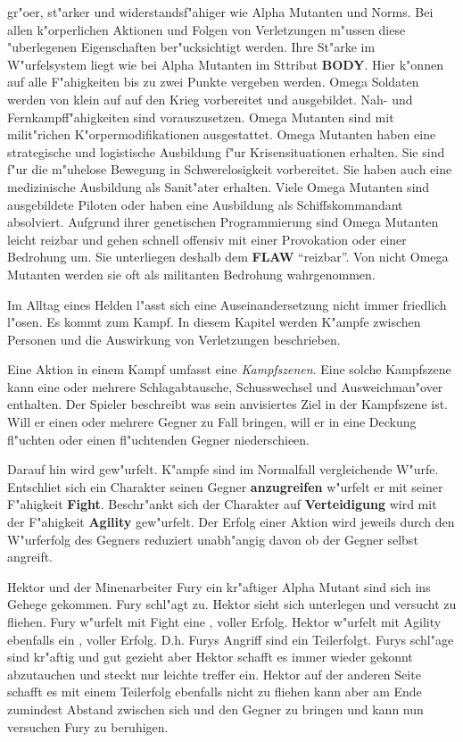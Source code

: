 \begin{description}
        gr"o\3er, st"arker und widerstandsf"ahiger wie Alpha Mutanten und Norms. Bei allen k"orperlichen Aktionen und Folgen von Verletzungen m"ussen diese "uberlegenen Eigenschaften ber"ucksichtigt werden. Ihre St"arke im W"urfelsystem liegt wie bei Alpha Mutanten im Sttribut \textbf{BODY}. Hier k"onnen auf alle F"ahigkeiten bis zu zwei Punkte vergeben werden. Omega Soldaten werden von klein auf auf den Krieg vorbereitet und ausgebildet. Nah- und Fernkampff"ahigkeiten sind vorauszusetzen. Omega Mutanten sind mit milit"richen K"orpermodifikationen ausgestattet. Omega Mutanten haben eine strategische und logistische Ausbildung f"ur Krisensituationen erhalten. Sie sind f"ur die m"uhelose Bewegung in Schwerelosigkeit vorbereitet. Sie haben auch eine medizinische Ausbildung als Sanit"ater erhalten. Viele Omega Mutanten sind ausgebildete Piloten oder haben eine Ausbildung als Schiffskommandant absolviert. Aufgrund ihrer genetischen Programmierung sind Omega Mutanten leicht reizbar und gehen schnell offensiv mit einer Provokation oder einer Bedrohung um. Sie unterliegen deshalb dem \textbf{FLAW} "`reizbar"'. Von nicht Omega Mutanten werden sie oft als militanten Bedrohung wahrgenommen.
\end{description}

Im Alltag eines Helden l"asst sich eine Auseinandersetzung nicht immer friedlich l"osen. Es kommt zum Kampf. In diesem Kapitel werden K"ampfe zwischen Personen und die Auswirkung von Verletzungen beschrieben.

Eine Aktion in einem Kampf umfasst eine \emph{Kampfszenen}. Eine solche Kampfszene kann eine oder mehrere Schlagabtausche, Schusswechsel und Ausweichman"over enthalten. Der Spieler beschreibt was sein anvisiertes Ziel in der Kampfszene ist. Will er einen oder mehrere Gegner zu Fall bringen, will er in eine Deckung fl"uchten oder einen fl"uchtenden Gegner niederschie\3en. 

Darauf hin wird gew"urfelt. K"ampfe sind im Normalfall vergleichende W"urfe. Entschlie\3t sich ein Charakter seinen Gegner \textbf{anzugreifen} w"urfelt er mit seiner F"ahigkeit \textbf{Fight}. Beschr"ankt sich der Charakter auf \textbf{Verteidigung} wird mit der F"ahigkeit \textbf{Agility} gew"urfelt. Der Erfolg einer Aktion wird jeweils durch den W"urferfolg des Gegners reduziert unabh"angig davon ob der Gegner selbst angreift.

\begin{ruleexample}
    Hektor und der Minenarbeiter Fury ein kr"aftiger Alpha Mutant sind sich ins Gehege gekommen. Fury schl"agt zu. Hektor sieht sich unterlegen und versucht zu fliehen. Fury w"urfelt mit Fight eine , voller Erfolg. Hektor w"urfelt mit Agility ebenfalls ein , voller Erfolg. D.h. Furys Angriff sind ein Teilerfolgt. Furys schl"age sind kr"aftig und gut gezieht aber Hektor schafft es immer wieder gekonnt abzutauchen und steckt nur leichte treffer ein. Hektor auf der anderen Seite schafft es mit einem Teilerfolg ebenfalls nicht zu fliehen kann aber am Ende zumindest Abstand zwischen sich und den Gegner zu bringen und kann nun versuchen Fury zu beruhigen.
\end{ruleexample}

